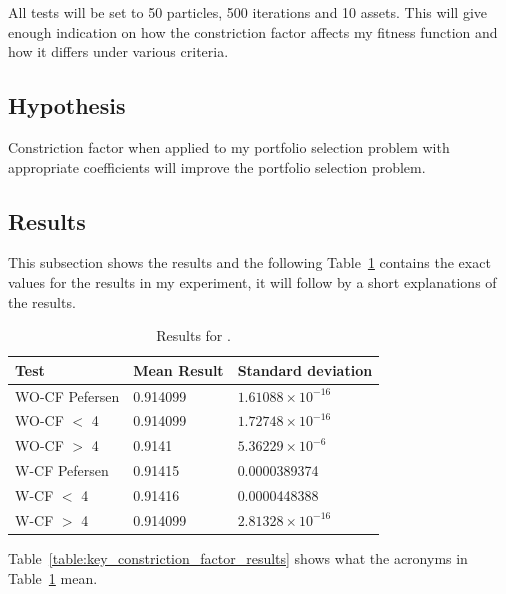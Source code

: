 \documentclass{pdfmx4020}
\begin{document}
      All tests will be set to 50 particles, 500 iterations and 10 assets. This will give enough indication on how the constriction factor affects my fitness function and how it differs under various criteria.     

    \subsection{Hypothesis} %
    \label{sub:hypothesis}
      Constriction factor when applied to my portfolio selection problem with appropriate coefficients will improve the portfolio selection problem.

    \subsection{Results} %
    \label{sub:results}
      This subsection shows the results and the following Table~\ref{table:constriction_factor_results} contains the exact values for the results in my experiment, it will follow by a short explanations of the results. 

        \begin{table}[ht]
          \setlength{\extrarowheight}{2.0pt}
          \begin{tabular}{|l|l|l|}
            \hline
            Test & Mean Result & Standard deviation \\
            \hline
            WO-CF Pefersen & 0.914099 & $1.61088\times10^{-16}$ \\
            \hline
            WO-CF $<$ 4 & 0.914099 & $1.72748\times10^{-16}$ \\
            \hline
            WO-CF $>$ 4 & 0.9141 & $5.36229\times10^{-6}$ \\
            \hline
            W-CF Pefersen & 0.91415 & 0.0000389374 \\
            \hline
            W-CF $<$ 4 & 0.91416 & 0.0000448388 \\
            \hline
            W-CF $>$ 4 & 0.914099 & $2.81328\times10^{-16}$ \\
            \hline
          \end{tabular}
          \caption{Results for .}
          \label{table:constriction_factor_results}
        \end{table}

      Table~\ref{table:key_constriction_factor_results} shows what the acronyms in Table~\ref{table:constriction_factor_results} mean. 
\end{document}
